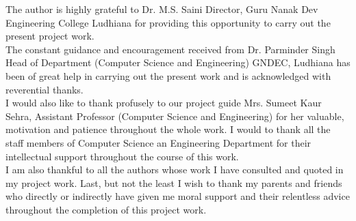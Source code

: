 \begin{Large}
\end{Large}
\vskip 0.1in The author is highly grateful to Dr. M.S. Saini Director, Guru
Nanak Dev Engineering College Ludhiana for providing this
opportunity to carry out the present project work.\\

\noindent The constant guidance and encouragement received from Dr. Parminder Singh Head of Department (Computer Science and Engineering) GNDEC, Ludhiana has been of great help in carrying out the present work and is acknowledged with reverential thanks.\\

\noindent I would also like to thank profusely to our project guide Mrs. Sumeet Kaur Sehra, Assistant Professor (Computer Science and Engineering) for her valuable, motivation and patience throughout the whole work. I would to thank all the staff members of Computer Science an Engineering Department for their intellectual support throughout the course of this work.\\

\noindent I am also thankful to all the authors whose work I have consulted and quoted in my project work. Last, but
not the least I wish to thank my parents and friends who directly or indirectly have given me moral support
and their relentless advice throughout the completion of this project work.

